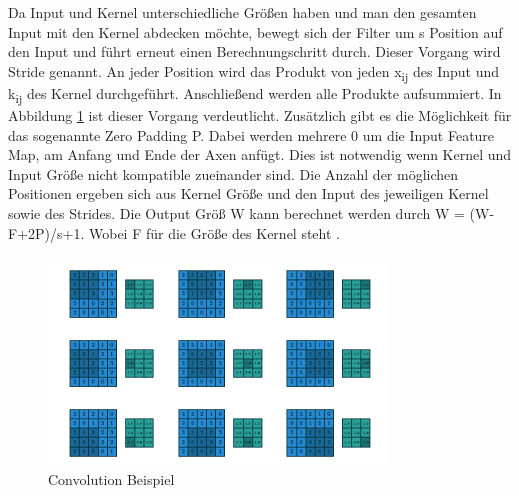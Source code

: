 \documentclass{llncs}
\begin{document}
	Da Input und Kernel unterschiedliche Größen haben und man den gesamten Input mit den Kernel abdecken möchte, bewegt sich der Filter um s Position auf den Input und führt erneut einen Berechnungschritt durch. Dieser Vorgang wird Stride genannt. An jeder Position wird das Produkt von jeden x\textsubscript{ij} des Input und k\textsubscript{ij} des Kernel durchgeführt.  Anschließend werden alle Produkte aufsummiert. In Abbildung \ref{fig:Bild3} ist dieser Vorgang verdeutlicht. Zusätzlich gibt es die Möglichkeit für das sogenannte Zero Padding P. Dabei werden mehrere 0 um die Input Feature Map, am Anfang und Ende der Axen anfügt. Dies ist notwendig wenn Kernel und Input Größe nicht kompatible zueinander sind. Die Anzahl der möglichen Positionen ergeben sich aus Kernel Größe und den Input des jeweiligen Kernel sowie des Strides. Die Output Größ W kann berechnet werden durch W = (W-F+2P)/s+1. Wobei F für die Größe des Kernel steht \cite{conv}.

	\begin{figure}
		\centering
		\includegraphics[width=0.8\textwidth]{conv.png}
		\caption{Convolution Beispiel}
		\label{fig:Bild3}
	\end{figure}
\end{document}
